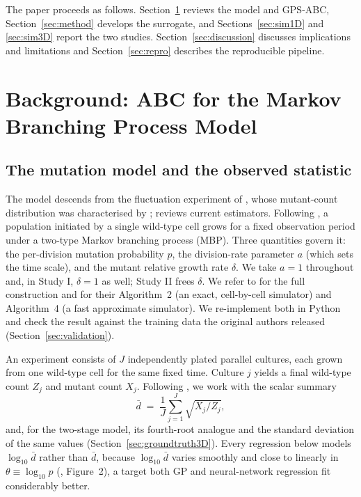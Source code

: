 \documentclass[sn-basic,iicol,pdflatex]{sn-jnl}
\newcommand{\dbar}{\ensuremath{\bar d}}
\begin{document}
The paper proceeds as follows. Section~\ref{sec:background} reviews the model
and GPS-ABC, Section~\ref{sec:method} develops the surrogate, and
Sections~\ref{sec:sim1D} and \ref{sec:sim3D} report the two studies.
Section~\ref{sec:discussion} discusses implications and limitations and
Section~\ref{sec:repro} describes the reproducible pipeline.

\section{Background: ABC for the Markov Branching Process Model}
\label{sec:background}

\subsection{The mutation model and the observed statistic}

The model descends from the fluctuation experiment of \citet{luria1943}, whose mutant-count distribution was characterised by \citet{lea1949}; \citet{zheng2021} reviews current estimators. Following \citet{lu2023}, a population initiated by a single wild-type cell
grows for a fixed observation period under a two-type Markov branching process
(MBP). Three quantities govern it: the per-division mutation probability $p$,
the division-rate parameter $a$ (which sets the time scale), and the mutant
relative growth rate $\delta$. We take $a=1$ throughout and, in Study I,
$\delta=1$ as well; Study II frees $\delta$. We refer to \citet{lu2023} for the full
construction and for their Algorithm~2 (an exact, cell-by-cell simulator) and
Algorithm~4 (a fast approximate simulator). We re-implement both in Python and
check the result against the training data the original authors released
(Section~\ref{sec:validation}).

An experiment consists of $J$ independently plated parallel cultures, each
grown from one wild-type cell for the same fixed time. Culture $j$ yields a
final wild-type count $Z_j$ and mutant count $X_j$. Following
\citeauthor{lu2023}, we work with the scalar summary
\[
\dbar \;=\; \frac{1}{J}\sum_{j=1}^{J} \sqrt{X_j / Z_j},
\]
and, for the two-stage model, its fourth-root analogue and the standard deviation of the same values (Section~\ref{sec:groundtruth3D}).
Every regression below models $\log_{10}\dbar$ rather than $\dbar$, because
$\log_{10}\dbar$ varies smoothly and close to linearly in $\theta \equiv
\log_{10} p$ (\citealp{lu2023}, Figure~2), a target both GP and neural-network
regression fit considerably better.
\end{document}
